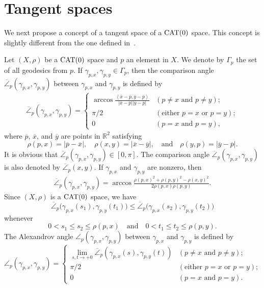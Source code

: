\documentclass[draft]{amsart}
\numberwithin{equation}{section}
\def\R{\mathbb R}
\newcommand{\ip}[2]{\left\langle #1, #2 \right\rangle}
\providecommand{\abs}[1]{\left\lvert#1\right\rvert}
\newcommand{\CAT}{\textup{CAT}}
\theoremstyle{plain}
\theoremstyle{definition}
\theoremstyle{remark}
\begin{document}
\section{Tangent spaces}

We next propose a concept of a tangent space 
of a $\CAT(0)$ space. 
This concept is slightly different 
from the one defined in~\cite{MR4292325}. 

Let $(X,\rho)$ be a $\CAT(0)$ space and $p$ an element in $X$. 
We denote by $\Gamma_p$ the set of all geodesics 
from $p$. If $\gamma_{p,x}, \gamma_{p,y}\in \Gamma_p$, then 
the comparison angle $\overline{\angle}_p(\gamma_{p,x}, \gamma_{p,y})$ 
between $\gamma_{p,x}$ and $\gamma_{p,y}$ 
is defined by 
\begin{align*}
 \overline{\angle}_p(\gamma_{p,x}, \gamma_{p,y}) =
 \begin{cases}
 \arccos
  \frac{\ip{\overline{x}-\overline{p}}{\overline{y}-\overline{p}}}
 {\abs{\overline{x}-\overline{p}}{\abs{\overline{y}-\overline{p}}}}
  & (\textrm{$p \neq x$ and 
 $p \neq y$}); \\
 \pi/2 & (\textrm{either $p=x$ or 
 $p=y$}); \\
 0 & (\textrm{$p=x$ and $p=y$}), 
 \end{cases}
\end{align*}
where $\overline{p}$, $\overline{x}$, and $\overline{y}$ 
are points in $\R^2$ satisfying 
\[
 \rho(p, x) 
 = \abs{\overline{p}-\overline{x}}, \quad 
 \rho(x, y) 
 = \abs{\overline{x}-\overline{y}}, \quad \textrm{and} \quad 
 \rho(y, p) = \abs{\overline{y}-\overline{p}}. 
\]
It is obvious that $\overline{\angle}_p(\gamma_{p,x}, \gamma_{p,y})\in [0,\pi]$. 
The comparison angle $\overline{\angle}_p(\gamma_{p,x}, \gamma_{p,y})$ 
is also denoted by $\overline{\angle}_p(x,y)$. 
If $\gamma_{p, x}$ and $\gamma_{p, y}$ are nonzero, then 
\begin{align}\label{eq:character-comparison}
 \overline{\angle}_p(\gamma_{p,x}, \gamma_{p,y}) 
 = \arccos 
 \frac{\rho(p, x)^2 + \rho(p, y)^2 - \rho(x,y)^2}{2\rho(p, x)\rho(p, y)}.  
\end{align}
Since $(X, \rho)$ is a $\CAT(0)$ space, we have 
\[
 \overline{\angle}_p\bigl(\gamma_{p,x}(s_1), \gamma_{p,y}(t_1)\bigr) 
 \leq 
 \overline{\angle}_p\bigl(\gamma_{p,x}(s_2), \gamma_{p,y}(t_2)\bigr) 
\]
whenever 
\[
 0<s_1\leq s_2\leq \rho(p,x)
 \quad \textrm{and} \quad 
 0<t_1\leq t_2\leq \rho(p,y). 
\]
The Alexandrov angle $\angle_p(\gamma_{p,x}, \gamma_{p,y})$ 
between $\gamma_{p,x}$ and $\gamma_{p,y}$ is defined by 
\[
 \angle_p(\gamma_{p,x}, \gamma_{p,y}) =
 \begin{cases}
 \lim_{s, t\rightarrow +0} 
 \overline{\angle}_p\left(\gamma_{p,x}(s), \gamma_{p,y}(t)\right) 
 & (\textrm{$p\neq x$ and $p\neq y$}); \\
 \pi/2 & (\textrm{either $p=x$ or 
 $p=y$}); \\
 0 & (\textrm{$p=x$ and $p=y$}). 
 \end{cases}
\]
\end{document}
